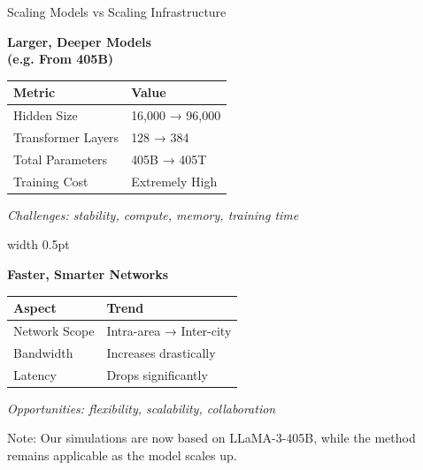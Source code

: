 \documentclass{beamer}
\begin{document}
\begin{frame}{Scaling Models vs Scaling Infrastructure}
    \centering
    \small

    \begin{minipage}{0.48\linewidth}
        \centering
        \textbf{Larger, Deeper Models \\ (e.g. From 405B)} \\
        \vspace{0.5em}
        \begin{tabular}{ll}
            \toprule
            \textbf{Metric} & \textbf{Value} \\
            \midrule
            Hidden Size & 16,000 → 96,000 \\
            Transformer Layers & 128 → 384 \\
            Total Parameters & 405B → 405T \\
            Training Cost & Extremely High \\
            \bottomrule
        \end{tabular}


        \vspace{2.3em}
        \textit{Challenges: stability, compute, memory, training time}
    \end{minipage}
    \hfill
    \vrule width 0.5pt
    \hfill
    \begin{minipage}{0.48\linewidth}
        \centering
        \textbf{Faster, Smarter Networks} \\
        \vspace{0.5em}
        \begin{tabular}{ll}
            \toprule
            \textbf{Aspect} & \textbf{Trend} \\
            \midrule
            Network Scope & Intra-area → Inter-city \\
            Bandwidth & Increases drastically \\
            Latency & Drops significantly \\
            \bottomrule
        \end{tabular}

        \vspace{5.0em}
        \textit{Opportunities: flexibility, scalability, collaboration}
    \end{minipage}
    \vspace{3.0em}
    
    Note: Our simulations are now based on LLaMA-3-405B, while the method remains applicable as the model scales up.
\end{frame}
\end{document}
